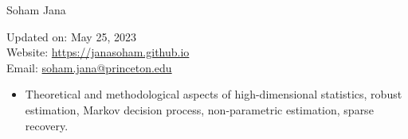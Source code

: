 \documentclass[letterpaper,11pt,oneside]{article}
\theoremstyle{definition}
\begin{document}
	
	
	\noindent  \Huge{Soham Jana} \\
	\vspace{1ex} 
	\normalsize
	
	\hfill
	\begin{minipage}{2.6in}
	Updated on: May 25, 2023 \\
	Website: \href{https://janasoham.github.io/}{https://janasoham.github.io}\\
	Email: \href{mailto:soham.jana@princeton.edu}{soham.jana@princeton.edu}
	\end{minipage}
	\vspace{1cm}
	
	
	
	
	
	
	\begin{itemize}
		\item[] Theoretical and methodological aspects of high-dimensional statistics, robust estimation, Markov decision process, non-parametric estimation, sparse recovery.
	\end{itemize}

	
\end{document}
